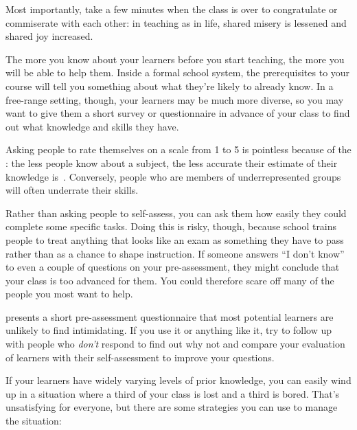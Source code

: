 Most importantly,
take a few minutes when the class is over to congratulate or commiserate with each other:
in teaching as in life,
shared misery is lessened and shared joy increased.


The more you know about your learners before you start teaching,
the more you will be able to help them.
Inside a formal school system,
the prerequisites to your course will tell you something about
what they're likely to already know.
In a free-range setting,
though,
your learners may be much more diverse,
so you may want to give them a short survey or questionnaire in advance of your class
to find out what knowledge and skills they have.

Asking people to rate themselves on a scale from 1 to 5 is pointless
because of the :
the less people know about a subject,
the less accurate their estimate of their knowledge is~\cite{Krug1999}.
Conversely,
people who are members of underrepresented groups will often underrate their skills.

Rather than asking people to self-assess,
you can ask them how easily they could complete some specific tasks.
Doing this is risky,
though,
because school trains people
to treat anything that looks like an exam as something they have to pass
rather than as a chance to shape instruction.
If someone answers ``I don't know'' to even a couple of questions on your pre-assessment,
they might conclude that your class is too advanced for them.
You could therefore scare off many of the people you most want to help.

 presents a short pre-assessment questionnaire
that most potential learners are unlikely to find intimidating.
If you use it or anything like it,
try to follow up with people who \emph{don't} respond to find out why not
and compare your evaluation of learners with their self-assessment
to improve your questions.


If your learners have widely varying levels of prior knowledge,
you can easily wind up in a situation where a third of your class is lost
and a third is bored.
That's unsatisfying for everyone,
but there are some strategies you can use to manage the situation:

